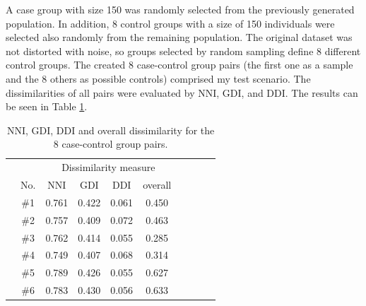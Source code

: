 		A case group with size 150 was randomly selected from the previously generated population. In addition, 8 control groups with a size of 150 individuals were selected also randomly from the remaining population. The original dataset was not distorted with noise, so groups selected by random sampling define 8 different control groups. The created 8 case-control group pairs (the first one as a sample and the 8 others as possible controls) comprised my test scenario. The dissimilarities of all pairs were evaluated by NNI, GDI, and DDI. The results can be seen in Table \ref{tab:result2}.
										
		\begin{table}[h]
			\centering
			\caption{NNI, GDI, DDI and overall dissimilarity for the 8 case-control group pairs.}\label{tab:result2}
			\bgroup
			\def\arraystretch{1.4}
			\begin{tabular}{cc|cccccccc} \toprule
				& & \multicolumn{4}{c}{Dissimilarity measure} \\
				                                         & No. & NNI                                   & GDI                                   & DDI                                   & overall                          \\ \bottomrule
				\multirow{9}{*}{\rotatebox{90}{Control}} & \#1 & 0.761                                 & 0.422                                 & 0.061                                 & 0.450                            \\
				                                         & \#2 & 0.757                                 & 0.409                                 & 0.072                                 & 0.463                            \\
				                                         & \#3 & 0.762                                 & 0.414                                 & \leavevmode\cellcolor{lightgray}0.055 & \leavevmode\cellcolor{gray}0.285 \\
				                                         & \#4 & \leavevmode\cellcolor{lightgray}0.749 & 0.407                                 & 0.068                                 & 0.314                            \\
				                                         & \#5 & 0.789                                 & 0.426                                 & \leavevmode\cellcolor{lightgray}0.055 & 0.627                            \\
				                                         & \#6 & 0.783                                 & 0.430                                 & 0.056                                 & 0.633                            \\

\end{tabular}
\end{table}
